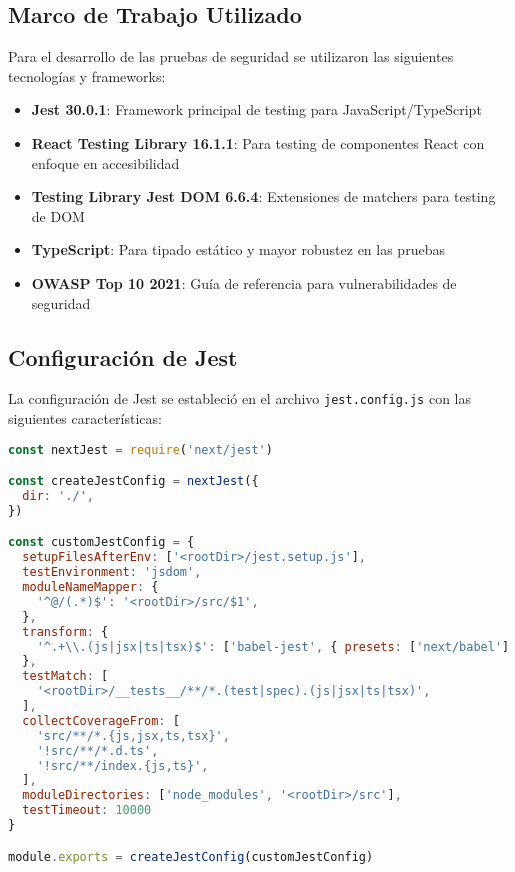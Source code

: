 \documentclass[12pt,a4paper]{article}
\begin{document}
\subsection{Marco de Trabajo Utilizado}

Para el desarrollo de las pruebas de seguridad se utilizaron las siguientes tecnologías y frameworks:

\begin{itemize}
    \item \textbf{Jest 30.0.1}: Framework principal de testing para JavaScript/TypeScript
    \item \textbf{React Testing Library 16.1.1}: Para testing de componentes React con enfoque en accesibilidad
    \item \textbf{Testing Library Jest DOM 6.6.4}: Extensiones de matchers para testing de DOM
    \item \textbf{TypeScript}: Para tipado estático y mayor robustez en las pruebas
    \item \textbf{OWASP Top 10 2021}: Guía de referencia para vulnerabilidades de seguridad
\end{itemize}

\subsection{Configuración de Jest}

La configuración de Jest se estableció en el archivo \texttt{jest.config.js} con las siguientes características:

\begin{lstlisting}[language=JavaScript, caption=Configuración de Jest]
const nextJest = require('next/jest')

const createJestConfig = nextJest({
  dir: './',
})

const customJestConfig = {
  setupFilesAfterEnv: ['<rootDir>/jest.setup.js'],
  testEnvironment: 'jsdom',
  moduleNameMapper: {
    '^@/(.*)$': '<rootDir>/src/$1',
  },
  transform: {
    '^.+\\.(js|jsx|ts|tsx)$': ['babel-jest', { presets: ['next/babel'] }],
  },
  testMatch: [
    '<rootDir>/__tests__/**/*.(test|spec).(js|jsx|ts|tsx)',
  ],
  collectCoverageFrom: [
    'src/**/*.{js,jsx,ts,tsx}',
    '!src/**/*.d.ts',
    '!src/**/index.{js,ts}',
  ],
  moduleDirectories: ['node_modules', '<rootDir>/src'],
  testTimeout: 10000
}

module.exports = createJestConfig(customJestConfig)
\end{lstlisting}
\end{document}
